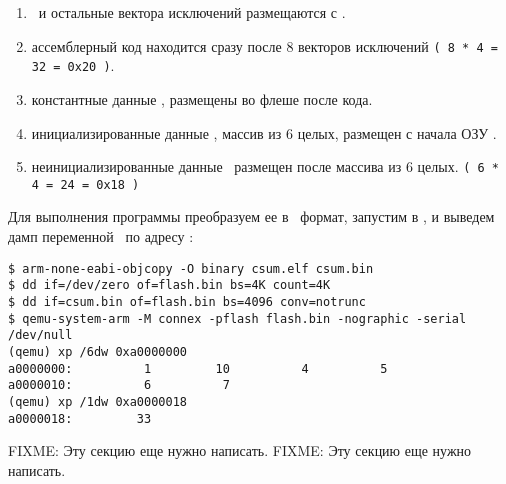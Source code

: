 \begin{enumerate}
  \item 
{}\ и остальные вектора исключений размещаются с .
  \item 
ассемблерный код находится сразу после 8 векторов исключений 
    \verb|( 8 * 4 = 32 = 0x20 )|.
  \item 
константные данные , размещены во флеше после кода.
  \item 
инициализированные данные , массив из 6 целых, размещен
    с начала ОЗУ .
  \item 
неинициализированные данные \ размещен после массива из 6 целых.
    \verb|( 6 * 4 = 24 = 0x18 )|
\end{enumerate}

Для выполнения программы преобразуем ее в \ формат, запустим в
\qemu, и выведем дамп переменной \ по адресу :

\begin{verbatim}
$ arm-none-eabi-objcopy -O binary csum.elf csum.bin
$ dd if=/dev/zero of=flash.bin bs=4K count=4K
$ dd if=csum.bin of=flash.bin bs=4096 conv=notrunc
$ qemu-system-arm -M connex -pflash flash.bin -nographic -serial /dev/null
(qemu) xp /6dw 0xa0000000
a0000000:          1         10          4          5
a0000010:          6          7
(qemu) xp /1dw 0xa0000018
a0000018:         33
\end{verbatim}

\secup
{} FIXME: Эту секцию еще нужно написать.
 FIXME: Эту секцию еще нужно написать.
\secdown
{}
\secup
{}
\label{kumarB}
 
\secup 
